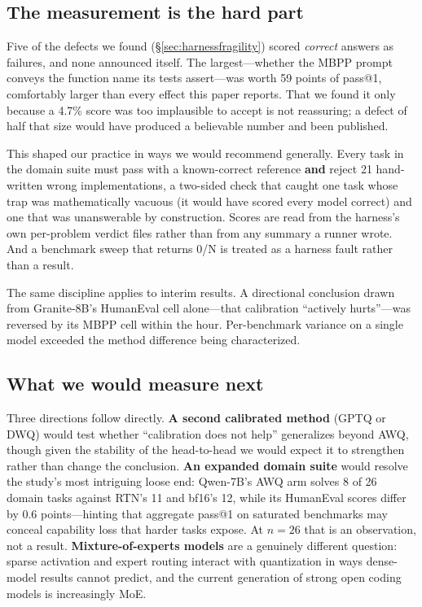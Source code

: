 \documentclass[11pt]{article}
\begin{document}
\subsection{The measurement is the hard part}

Five of the defects we found (\S\ref{sec:harnessfragility}) scored \emph{correct} answers
as failures, and none announced itself. The largest---whether the MBPP prompt conveys the
function name its tests assert---was worth 59 points of pass@1, comfortably larger than
every effect this paper reports. That we found it only because a 4.7\% score was too
implausible to accept is not reassuring; a defect of half that size would have produced a
believable number and been published.

This shaped our practice in ways we would recommend generally. Every task in the domain
suite must pass with a known-correct reference \textbf{and} reject 21 hand-written wrong
implementations, a two-sided check that caught one task whose trap was mathematically
vacuous (it would have scored every model correct) and one that was unanswerable by
construction. Scores are read from the harness's own per-problem verdict files rather than
from any summary a runner wrote. And a benchmark sweep that returns 0/N is treated as a
harness fault rather than a result.

The same discipline applies to interim results. A directional conclusion drawn from
Granite-8B's HumanEval cell alone---that calibration ``actively hurts''---was reversed by
its MBPP cell within the hour. Per-benchmark variance on a single model exceeded the
method difference being characterized.

\subsection{What we would measure next}
\label{sec:next}

Three directions follow directly. \textbf{A second calibrated method} (GPTQ or DWQ) would
test whether ``calibration does not help'' generalizes beyond AWQ, though given the
stability of the head-to-head we would expect it to strengthen rather than change the
conclusion. \textbf{An expanded domain suite} would resolve the study's most intriguing
loose end: Qwen-7B's AWQ arm solves 8 of 26 domain tasks against RTN's 11 and bf16's 12,
while its HumanEval scores differ by 0.6 points---hinting that aggregate pass@1 on
saturated benchmarks may conceal capability loss that harder tasks expose. At $n = 26$
that is an observation, not a result. \textbf{Mixture-of-experts models} are a genuinely
different question: sparse activation and expert routing interact with quantization in
ways dense-model results cannot predict, and the current generation of strong open coding
models is increasingly MoE.
\end{document}
